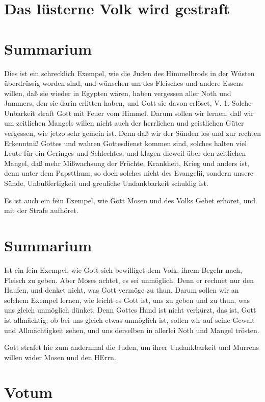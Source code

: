 \section{Das lüsterne Volk wird gestraft}

\section{Summarium}

Dies ist ein schrecklich Exempel, wie die Juden des Himmelbrods in der Wüsten überdrüssig worden sind, und wünschen um des Fleisches und andere Essens willen, daß sie wieder in Egypten wären, haben vergessen aller Noth und Jammers, den sie darin erlitten haben, und Gott sie davon erlöset, V. 1. Solche Unbarkeit straft Gott mit Feuer vom Himmel. Darum sollen wir lernen, daß wir um zeitlichen Mangels willen nicht auch der herrlichen und geistlichen Güter vergessen, wie jetzo sehr gemein ist. Denn daß wir der Sünden los und zur rechten Erkenntniß Gottes und wahren Gottesdienst kommen sind, solches halten viel Leute für ein Geringes und Schlechtes; und klagen dieweil über den zeitlichen Mangel, daß
mehr Mißwachsung der Früchte, Krankheit, Krieg und anders ist, denn unter dem Papstthum, so doch solches nicht des Evangelii, sondern unsere Sünde, Unbußfertigkeit und greuliche Undankbarkeit schuldig ist.

Es ist auch ein fein Exempel, wie Gott Mosen und des Volks Gebet erhöret, und mit der Strafe aufhöret.

\section{Summarium}

Ist ein fein Exempel, wie Gott sich bewilliget dem Volk, ihrem Begehr nach, Fleisch zu geben. Aber Moses achtet, es sei unmöglich. Denn er rechnet nur den Haufen, und denket nicht, was Gott vermöge zu thun. Darum sollen wir an solchem Exempel lernen, wie leicht es Gott ist, uns zu geben und zu thun, was uns gleich unmöglich dünket. Denn Gottes Hand ist nicht verkürzt, das ist, Gott ist allmächtig; ob bei uns gleich etwas unmöglich ist, sollen wir auf seine Gewalt und Allmächtigkeit sehen, und uns derselben in allerlei Noth und Mangel trösten.

Gott strafet hie zum andernmal die Juden, um ihrer Undankbarkeit und Murrens willen wider Mosen und den HErrn.

\section{Votum}

